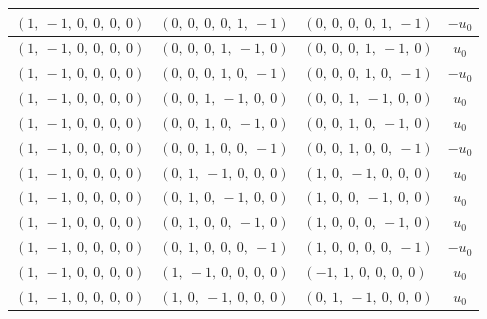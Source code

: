 \documentclass[11pt]{article}
\theoremstyle{definition}
\begin{document}
\begin{longtable}{|l|l|l|c|}
    \hline
    $\left( 1, \  -1, \  0, \  0, \  0, \  0\right)$ & $\left( 0, \  0, \  0, \  0, \  1, \  -1\right)$ & $\left( 0, \  0, \  0, \  0, \  1, \  -1\right)$ & $- u_{0}$ \\
    \hline
    $\left( 1, \  -1, \  0, \  0, \  0, \  0\right)$ & $\left( 0, \  0, \  0, \  1, \  -1, \  0\right)$ & $\left( 0, \  0, \  0, \  1, \  -1, \  0\right)$ & $u_{0}$ \\
    \hline
    $\left( 1, \  -1, \  0, \  0, \  0, \  0\right)$ & $\left( 0, \  0, \  0, \  1, \  0, \  -1\right)$ & $\left( 0, \  0, \  0, \  1, \  0, \  -1\right)$ & $- u_{0}$ \\
    \hline
    $\left( 1, \  -1, \  0, \  0, \  0, \  0\right)$ & $\left( 0, \  0, \  1, \  -1, \  0, \  0\right)$ & $\left( 0, \  0, \  1, \  -1, \  0, \  0\right)$ & $u_{0}$ \\
    \hline
    $\left( 1, \  -1, \  0, \  0, \  0, \  0\right)$ & $\left( 0, \  0, \  1, \  0, \  -1, \  0\right)$ & $\left( 0, \  0, \  1, \  0, \  -1, \  0\right)$ & $u_{0}$ \\
    \hline
    $\left( 1, \  -1, \  0, \  0, \  0, \  0\right)$ & $\left( 0, \  0, \  1, \  0, \  0, \  -1\right)$ & $\left( 0, \  0, \  1, \  0, \  0, \  -1\right)$ & $- u_{0}$ \\
    \hline
    $\left( 1, \  -1, \  0, \  0, \  0, \  0\right)$ & $\left( 0, \  1, \  -1, \  0, \  0, \  0\right)$ & $\left( 1, \  0, \  -1, \  0, \  0, \  0\right)$ & $u_{0}$ \\
    \hline
    $\left( 1, \  -1, \  0, \  0, \  0, \  0\right)$ & $\left( 0, \  1, \  0, \  -1, \  0, \  0\right)$ & $\left( 1, \  0, \  0, \  -1, \  0, \  0\right)$ & $u_{0}$ \\
    \hline
    $\left( 1, \  -1, \  0, \  0, \  0, \  0\right)$ & $\left( 0, \  1, \  0, \  0, \  -1, \  0\right)$ & $\left( 1, \  0, \  0, \  0, \  -1, \  0\right)$ & $u_{0}$ \\
    \hline
    $\left( 1, \  -1, \  0, \  0, \  0, \  0\right)$ & $\left( 0, \  1, \  0, \  0, \  0, \  -1\right)$ & $\left( 1, \  0, \  0, \  0, \  0, \  -1\right)$ & $- u_{0}$ \\
    \hline
    $\left( 1, \  -1, \  0, \  0, \  0, \  0\right)$ & $\left( 1, \  -1, \  0, \  0, \  0, \  0\right)$ & $\left( -1, \  1, \  0, \  0, \  0, \  0\right)$ & $u_{0}$ \\
    \hline
    $\left( 1, \  -1, \  0, \  0, \  0, \  0\right)$ & $\left( 1, \  0, \  -1, \  0, \  0, \  0\right)$ & $\left( 0, \  1, \  -1, \  0, \  0, \  0\right)$ & $u_{0}$ \\

\end{longtable}
\end{document}
